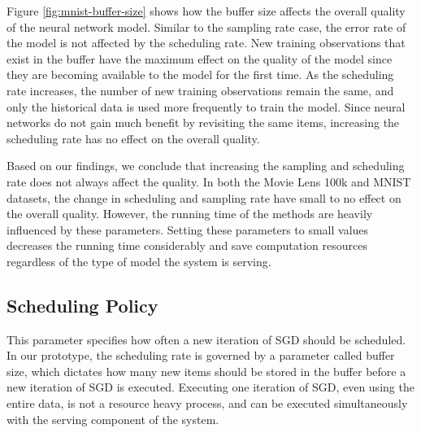 Figure \ref{fig:mnist-buffer-size} shows how the buffer size affects the overall quality of the neural network model.
Similar to the sampling rate case, the error rate of the model is not affected by the scheduling rate.
New training observations that exist in the buffer have the maximum effect on the quality of the model since they are becoming available to the model for the first time.
As the scheduling rate increases, the number of new training observations remain the same, and only the historical data is used more frequently to train the model.
Since neural networks do not gain much benefit by revisiting the same items, increasing the scheduling rate has no effect on the overall quality.

Based on our findings, we conclude that increasing the sampling and scheduling rate does not always affect the quality.
In both the Movie Lens 100k and MNIST datasets, the change in scheduling and sampling rate have small to no effect on the overall quality.
However, the running time of the methods are heavily influenced by these parameters.
Setting these parameters to small values decreases the running time considerably and save computation resources regardless of the type of model the system is serving.

\subsection{Scheduling Policy}
This parameter specifies how often a new iteration of SGD should be scheduled. 
In our prototype, the scheduling rate is governed by a parameter called buffer size, which dictates how many new items should be stored in the buffer before a new iteration of SGD is executed. 
Executing one iteration of SGD, even using the entire data, is not a resource heavy process, and can be executed simultaneously with the serving component of the system. 

